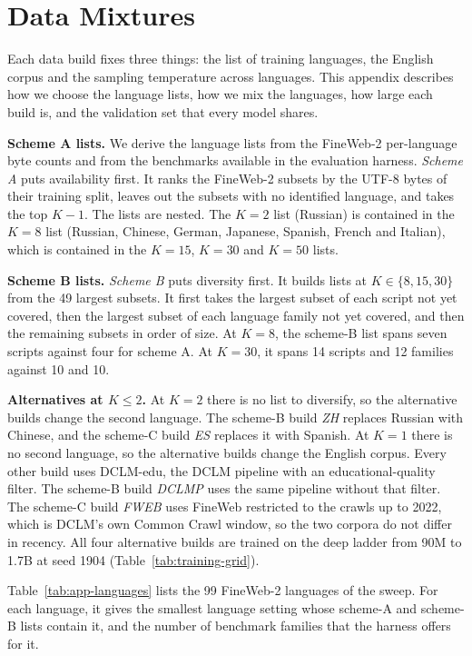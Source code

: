 \section{Data Mixtures}
\label{app:data-mixtures}

Each data build fixes three things: the list of training languages, the English corpus and the sampling temperature across languages. This appendix describes how we choose the language lists, how we mix the languages, how large each build is, and the validation set that every model shares.

\textbf{Scheme A lists.} We derive the language lists from the FineWeb-2 per-language byte counts and from the benchmarks available in the evaluation harness. \emph{Scheme A} puts availability first. It ranks the FineWeb-2 subsets by the UTF-8 bytes of their training split, leaves out the subsets with no identified language, and takes the top $K-1$. The lists are nested. The $K=2$ list (Russian) is contained in the $K=8$ list (Russian, Chinese, German, Japanese, Spanish, French and Italian), which is contained in the $K=15$, $K=30$ and $K=50$ lists.

\textbf{Scheme B lists.} \emph{Scheme B} puts diversity first. It builds lists at $K \in \{8, 15, 30\}$ from the 49 largest subsets. It first takes the largest subset of each script not yet covered, then the largest subset of each language family not yet covered, and then the remaining subsets in order of size. At $K=8$, the scheme-B list spans seven scripts against four for scheme A. At $K=30$, it spans 14 scripts and 12 families against 10 and 10.

\textbf{Alternatives at $K \le 2$.} At $K=2$ there is no list to diversify, so the alternative builds change the second language. The scheme-B build \emph{ZH} replaces Russian with Chinese, and the scheme-C build \emph{ES} replaces it with Spanish. At $K=1$ there is no second language, so the alternative builds change the English corpus. Every other build uses DCLM-edu, the DCLM pipeline with an educational-quality filter. The scheme-B build \emph{DCLMP} uses the same pipeline without that filter. The scheme-C build \emph{FWEB} uses FineWeb restricted to the crawls up to 2022, which is DCLM's own Common Crawl window, so the two corpora do not differ in recency. All four alternative builds are trained on the deep ladder from 90M to 1.7B at seed 1904 (Table~\ref{tab:training-grid}).

Table~\ref{tab:app-languages} lists the 99 FineWeb-2 languages of the sweep. For each language, it gives the smallest language setting whose scheme-A and scheme-B lists contain it, and the number of benchmark families that the harness offers for it.

